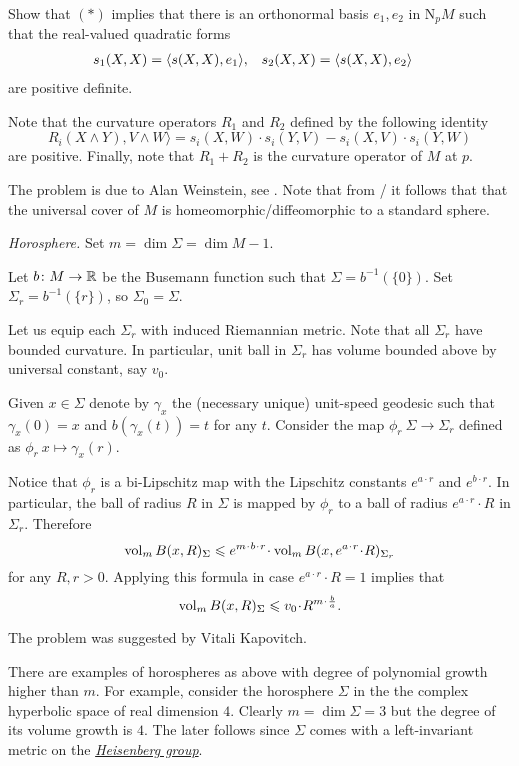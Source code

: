 Show that $({*})$ implies that there is an orthonormal basis $e_1,e_2$ in $\mathrm{N}_pM$ 
such that the real-valued quadratic forms 
\begin{align*}
s_1(X,X)&=\langle s(X,X),e_1\rangle,
&
s_2(X,X)&=\langle s(X,X),e_2\rangle
\end{align*}
are positive definite.

Note that the curvature operators $R_1$ and $R_2$ defined by the following identity
\[R_{i}(X\wedge Y), V\wedge W\rangle 
=s_i(X,W)\cdot s_i(Y,V)-s_i(X,V)\cdot s_i(Y,W)\]
 are positive.
Finally, note that $R_{1}+R_{2}$ is the curvature operator of $M$ at $p$.

The problem is due to Alan Weinstein, see  \cite{weinstein}.
Note that from \cite{micallef-moore}/\cite{boehm-wilking} it follows that
that the universal cover of $M$ is homeomorphic/diffeomorphic to a standard sphere.



\textit{Horosphere.}
Set 
$m=\dim \Sigma=\dim M-1$.

Let $b\colon M\to\mathbb{R}$ be the Busemann function such that $\Sigma=b^{-1}(\{0\})$.
Set  $\Sigma_r=b^{-1}(\{r\})$, so $\Sigma_0=\Sigma$.

Let us equip each $\Sigma_r$ with induced Riemannian metric.
Note that all $\Sigma_r$ have bounded curvature.
In particular, unit ball in $\Sigma_r$ has volume bounded above by universal constant, say $v_0$.
 

Given $x\in \Sigma$ denote by $\gamma_x$ 
the (necessary unique) unit-speed geodesic
such that $\gamma_x(0)=x$ and $b(\gamma_x(t))=t$ for any $t$.
Consider the map $\phi_{r}\:\Sigma\to\Sigma_r$ defined as
$\phi_r\:x\mapsto \gamma_x(r)$.

Notice that $\phi_r$ is a bi-Lipschitz map with the Lipschitz constants $e^{a\cdot r}$ and $e^{b\cdot r}$.
In particular, the ball of radius $R$ in $\Sigma$ is mapped by $\phi_r$
to a ball of radius $e^{a\cdot r}\cdot R$ in $\Sigma_r$.
Therefore
\[\vol_m B(x,R)_\Sigma\le e^{m\cdot b\cdot r}\cdot \vol_m B(x,e^{a\cdot r}\cdot R)_{\Sigma_r}\]
for any $R,r>0$.
Applying this formula in case $e^{a\cdot r}\cdot R=1$ implies that
\[\vol_m B(x,R)_\Sigma\le v_0\cdot R^{m\cdot \frac ba}.\]

The problem was suggested by Vitali Kapovitch.

There are examples of horospheres as above with degree of polynomial growth higher than $m$.
For example, consider the horosphere $\Sigma$ in the
the complex hyperbolic space 
of real dimension $4$.
Clearly $m=\dim \Sigma=3$ but the degree of its volume growth is $4$.
The later follows since $\Sigma$ comes with a left-invariant metric on the \hyperref[Heisenberg group]{\emph{Heisenberg group}}.


